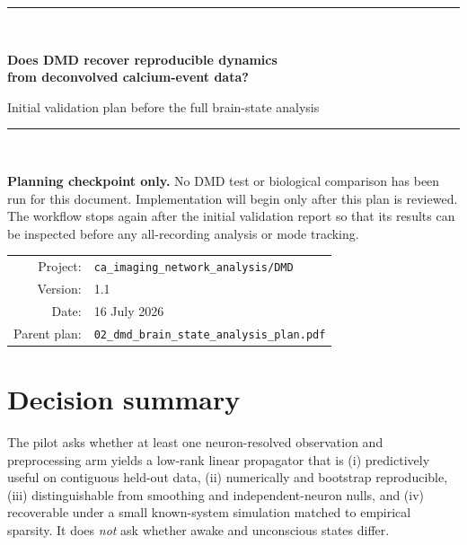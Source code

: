 \documentclass[11pt,a4paper]{article}
\begin{document}
\hypersetup{pageanchor=false}

\begin{titlepage}
  \centering
  \vspace*{1.6cm}
  {\color{navy}\rule{\textwidth}{1.2pt}}\\[1.0cm]
  {\Huge\bfseries Does DMD recover reproducible dynamics\\[0.2em]
  from deconvolved calcium-event data?\par}
  \vspace{0.55cm}
  {\Large Initial validation plan before the full brain-state analysis\par}
  \vspace{0.9cm}
  {\color{navy}\rule{\textwidth}{0.6pt}}\\[0.9cm]
  \begin{tcolorbox}[colback=pale,colframe=teal,width=0.92\textwidth,arc=2pt]
  \centering
  \textbf{Planning checkpoint only.} No DMD test or biological comparison has
  been run for this document. Implementation will begin only after this plan is
  reviewed. The workflow stops again after the initial validation report so that
  its results can be inspected before any all-recording analysis or mode tracking.
  \end{tcolorbox}
  \vfill
  \begin{tabular}{rl}
    Project: & \texttt{ca\_imaging\_network\_analysis/DMD}\\
    Version: & 1.1\\
    Date: & 16 July 2026\\
    Parent plan: & \texttt{02\_dmd\_brain\_state\_analysis\_plan.pdf}
  \end{tabular}
  \vfill
\end{titlepage}

\hypersetup{pageanchor=true}
\tableofcontents
\clearpage
{}

\section{Decision summary}

\begin{decisionbox}
The pilot asks whether at least one neuron-resolved observation and preprocessing
arm yields a low-rank linear propagator that is (i) predictively useful on
contiguous held-out data, (ii) numerically and bootstrap reproducible, (iii)
distinguishable from smoothing and independent-neuron nulls, and (iv) recoverable
under a small known-system simulation matched to empirical sparsity. It does
\emph{not} ask whether awake and unconscious states differ.
\end{decisionbox}
\end{document}

